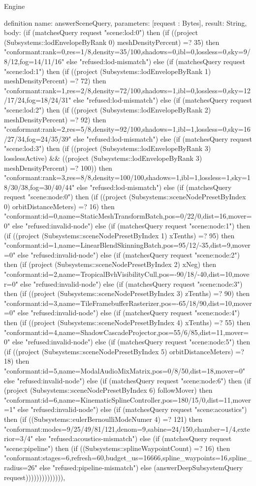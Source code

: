 \begin{lexlean}{Engine}
\begin{semanticmodule}
definition{
  name: answerSceneQuery,
  parameters: [request : Bytes],
  result: String,
  body: (if (matchesQuery request "scene:lod:0") then (if ((project (Subsystems::lodEnvelopeByRank 0) meshDensityPercent) =? 35) then "conformant:rank=0,res=1/8,density=35/100,shadows=0,ibl=0,lossless=0,sky=9/8/12,fog=14/11/16" else "refused:lod-mismatch") else (if (matchesQuery request "scene:lod:1") then (if ((project (Subsystems::lodEnvelopeByRank 1) meshDensityPercent) =? 72) then "conformant:rank=1,res=2/8,density=72/100,shadows=1,ibl=0,lossless=0,sky=12/17/24,fog=18/24/31" else "refused:lod-mismatch") else (if (matchesQuery request "scene:lod:2") then (if ((project (Subsystems::lodEnvelopeByRank 2) meshDensityPercent) =? 92) then "conformant:rank=2,res=5/8,density=92/100,shadows=1,ibl=1,lossless=0,sky=16/27/34,fog=24/35/39" else "refused:lod-mismatch") else (if (matchesQuery request "scene:lod:3") then (if ((project (Subsystems::lodEnvelopeByRank 3) losslessActive) && ((project (Subsystems::lodEnvelopeByRank 3) meshDensityPercent) =? 100)) then "conformant:rank=3,res=8/8,density=100/100,shadows=1,ibl=1,lossless=1,sky=18/30/38,fog=30/40/44" else "refused:lod-mismatch") else (if (matchesQuery request "scene:node:0") then (if ((project (Subsystems::sceneNodePresetByIndex 0) orbitDistanceMeters) =? 16) then "conformant:id=0,name=StaticMeshTransformBatch,pos=0/22/0,dist=16,mover=0" else "refused:invalid-node") else (if (matchesQuery request "scene:node:1") then (if ((project (Subsystems::sceneNodePresetByIndex 1) xTenths) =? 95) then "conformant:id=1,name=LinearBlendSkinningBatch,pos=95/12/-35,dist=9,mover=0" else "refused:invalid-node") else (if (matchesQuery request "scene:node:2") then (if (project (Subsystems::sceneNodePresetByIndex 2) xNeg) then "conformant:id=2,name=TropicalBvhVisibilityCull,pos=-90/18/-40,dist=10,mover=0" else "refused:invalid-node") else (if (matchesQuery request "scene:node:3") then (if ((project (Subsystems::sceneNodePresetByIndex 3) zTenths) =? 90) then "conformant:id=3,name=TileFramebufferRasterizer,pos=-65/18/90,dist=10,mover=0" else "refused:invalid-node") else (if (matchesQuery request "scene:node:4") then (if ((project (Subsystems::sceneNodePresetByIndex 4) xTenths) =? 55) then "conformant:id=4,name=ShadowCascadeProjector,pos=55/6/85,dist=11,mover=0" else "refused:invalid-node") else (if (matchesQuery request "scene:node:5") then (if ((project (Subsystems::sceneNodePresetByIndex 5) orbitDistanceMeters) =? 18) then "conformant:id=5,name=ModalAudioMixMatrix,pos=0/8/50,dist=18,mover=0" else "refused:invalid-node") else (if (matchesQuery request "scene:node:6") then (if (project (Subsystems::sceneNodePresetByIndex 6) followMover) then "conformant:id=6,name=KinematicSplineController,pos=180/15/0,dist=11,mover=1" else "refused:invalid-node") else (if (matchesQuery request "scene:acoustics") then (if ((Subsystems::eulerBernoulliModeNumer 4) =? 121) then "conformant:modes=9/25/49/81/121,denom=9,sabine=24/150,chamber=1/4,exterior=3/4" else "refused:acoustics-mismatch") else (if (matchesQuery request "scene:pipeline") then (if ((Subsystems::splineWaypointCount) =? 16) then "conformant:stages=6,refresh=60,budget_us=16666,spline_waypoints=16,spline_radius=26" else "refused:pipeline-mismatch") else (answerDeepSubsystemQuery request)))))))))))))),
}
\end{semanticmodule}
\end{lexlean}
